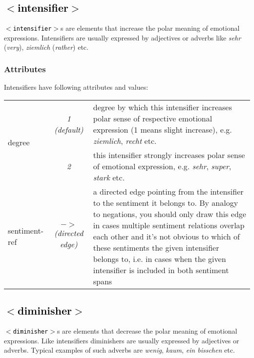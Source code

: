 \documentclass[11pt,a4paper]{article}
\newcommand{\xmltag}[1]{\textcolor{black}{{\small$<$#1$>$}}}
\begin{document}
\subsection{\xmltag{intensifier}}
\texttt{\xmltag{intensifier}}s are elements that increase the polar
meaning of emotional expressions. Intensifiers are usually expressed
by adjectives or adverbs like \textit{sehr} (\textit{very}),
\textit{ziemlich} (\textit{rather}) etc.

\subsubsection{Attributes}
Intensifiers have following attributes and values:

\begin{tabular}{|l|c|p{}|}\hline
  \multirow{2}{*}{degree} & \textit{1 (default)} & degree by which
  this intensifier increases polar sense of respective emotional
  expression (1 means slight increase), e.g. \textit{ziemlich},
  \textit{recht} etc.\\\cline{2-3}

  & \textit{2} & this intensifier strongly increases polar sense of
  emotional expression, e.g. \textit{sehr}, \textit{super},
  \textit{stark} etc.\\\hline


  sentiment-ref & \textit{$->$\newline(directed edge)} & a directed
  edge pointing from the intensifier to the sentiment it belongs
  to. By analogy to negations, you should only draw this edge in cases
  multiple sentiment relations overlap each other and it's not obvious
  to which of these sentiments the given intensifier belongs to,
  i.e. in cases when the given intensifier is included in both
  sentiment spans\\\hline
\end{tabular}


\subsection{\xmltag{diminisher}}
\texttt{\xmltag{diminisher}}s are elements that decrease the polar
meaning of emotional expressions. Like intensifiers diminishers are
usually expressed by adjectives or adverbs. Typical examples of such
adverbs are \textit{wenig}, \textit{kaum}, \textit{ein bisschen} etc.
\end{document}

